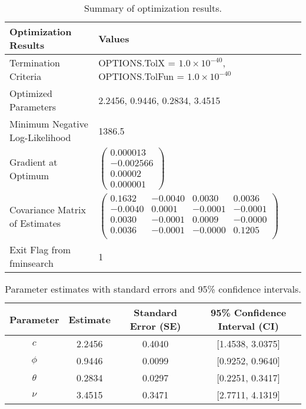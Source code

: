 \documentclass[12pt]{article}
\begin{document}
\begin{table}[h!]
\centering
\begin{tabular}{|l|l|}
\hline
\textbf{Optimization Results}              & \textbf{Values}                                                                 \\ \hline
Termination Criteria                       & OPTIONS.TolX = $1.0 \times 10^{-40}$, OPTIONS.TolFun = $1.0 \times 10^{-40}$     \\ \hline
Optimized Parameters                       & 2.2456, 0.9446, 0.2834, 3.4515                                                  \\ \hline
Minimum Negative Log-Likelihood            & 1386.5                                                                          \\ \hline
Gradient at Optimum                        & $\begin{pmatrix}
0.000013 \\
-0.002566 \\
0.00002 \\
0.000001
\end{pmatrix}$                                                                  \\ \hline
Covariance Matrix of Estimates             & $\begin{pmatrix}
0.1632 & -0.0040 & 0.0030 & 0.0036 \\
-0.0040 & 0.0001 & -0.0001 & -0.0001 \\
0.0030 & -0.0001 & 0.0009 & -0.0000 \\
0.0036 & -0.0001 & -0.0000 & 0.1205 \\
\end{pmatrix}$                                                                \\ \hline
Exit Flag from fminsearch                  & 1                                                                              \\ \hline
\end{tabular}
\caption{Summary of optimization results.}
\label{tab:optimization_results}
\end{table}


\begin{table}[h!]
\centering
\begin{tabular}{|c|c|c|c|}
\hline
\textbf{Parameter} & \textbf{Estimate} & \textbf{Standard Error (SE)} & \textbf{95\% Confidence Interval (CI)} \\ \hline
$c$     & 2.2456 & 0.4040 & [1.4538, 3.0375] \\ \hline
$\phi$  & 0.9446 & 0.0099 & [0.9252, 0.9640] \\ \hline
$\theta$ & 0.2834 & 0.0297 & [0.2251, 0.3417] \\ \hline
$\nu$    & 3.4515 & 0.3471 & [2.7711, 4.1319] \\ \hline
\end{tabular}
\caption{Parameter estimates with standard errors and 95\% confidence intervals.}
\label{tab:firstconfidence_intervals}
\end{table}
\end{document}
